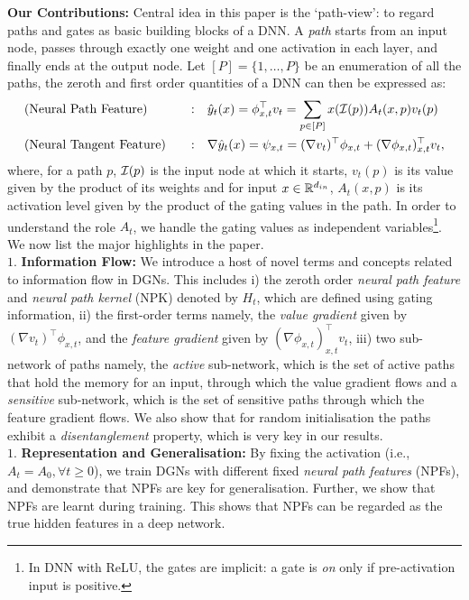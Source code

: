 \textbf{Our Contributions:} Central idea in this paper is the `path-view': to regard paths and gates as basic building blocks of a DNN. A \emph{path} starts from an input node, passes through exactly one weight and one activation in each layer, and finally ends at the output node. Let $[P]=\{1,\ldots,P\}$ be an enumeration of all the paths, the zeroth and first order quantities of a DNN can then be expressed as:
\begin{align}
\label{eq:zero}&\text{(Neural Path Feature)}&\quad:& \quad \hat{y}_t(x)={\phi^\top_{x,t}} v_t=\sum_{p\in [P]}x(\mathcal{I}(p))A_t(x,p)v_t(p)\\
\label{eq:first}&\text{(Neural Tangent Feature)}&\quad:&\quad   \nabla \hat{y}_t(x)=\psi_{x,t}=(\nabla v_t )^\top \phi_{x,t} + (\nabla \phi_{x,t})^\top_{x,t} v_t,
\end{align}
where, for a path $p$, $\mathcal{I}(p)$ is the input node at which it starts, $v_t(p)$ is its value given by the product of its weights and for input $x\in\mathbb{R}^{d_{in}}$, $A_t(x,p)$ is its activation level given by the product of the gating values in the path. In order to understand the role $A_t$, we handle the gating values as independent variables\footnote{In DNN with ReLU, the gates are implicit: a gate is \emph{on} only if pre-activation input is positive.}. We now list the major highlights in the paper.\hfill\\
$1.$ \textbf{Information Flow:} We introduce a host of novel terms and concepts related to information flow in DGNs. This includes i) the zeroth order \emph{neural path feature} and \emph{neural path kernel} (NPK) denoted by $H_t$, which are defined using gating information, ii) the first-order terms namely, the \emph{value gradient} given by $(\nabla v_t )^\top \phi_{x,t}$, and the \emph{feature gradient} given by $(\nabla \phi_{x,t})^\top_{x,t} v_t$, iii)  two sub-network of paths namely, the \emph{active} sub-network, which is the set of active paths that hold the memory for an input, through which the value gradient flows and a \emph{sensitive} sub-network, which is the set of sensitive paths through which the feature gradient flows. We also show that for random initialisation the paths exhibit a \emph{disentanglement} property, which is very key in our results.\\
$1.$ \textbf{Representation and Generalisation:} By fixing the activation (i.e., $A_t=A_0,\forall t\geq 0$), we train DGNs with different fixed \emph{neural path features} (NPFs), and demonstrate that NPFs are key for generalisation. Further, we show that NPFs are learnt during training. This shows that NPFs can be regarded as the true hidden features in a deep network.\\
